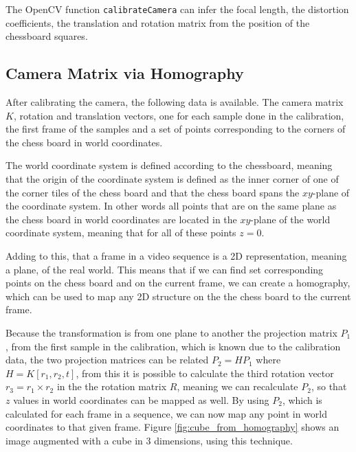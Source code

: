 \documentclass[a4paper,11pt]{article}
\begin{document}
The OpenCV function \texttt{calibrateCamera} can infer the focal length, the distortion coefficients, the translation and rotation matrix from the position of the chessboard squares.

\subsection{Camera Matrix via Homography}
After calibrating the camera, the following data is available. The camera matrix $K$, rotation and translation vectors, one for each sample done in the calibration, the first frame of the samples and a set of points corresponding to the corners of the chess board in world coordinates.

The world coordinate system is defined according to the chessboard, meaning that the origin of the coordinate system is defined as the inner corner of one of the corner tiles of the chess board and that the chess board spans the $xy$-plane of the coordinate system. In other words all points that are on the same plane as the chess board in world coordinates are located in the $xy$-plane of the world coordinate system, meaning that for all of these points $z=0$.

Adding to this, that a frame in a video sequence is a 2D representation, meaning a plane, of the real world. This means that if we can find set corresponding points on the chess board and on the current frame, we can create a homography, which can be used to map any 2D structure on the the chess board to the current frame.

Because the transformation is from one plane to another the projection matrix $P_1$, from  the first sample in the calibration, which is known due to the calibration data, the two projection matrices can be related $P_2 = H P_1$ where $H = K[r_1,r_2,t]$, from this it is possible to calculate the third rotation vector $r_3 = r_1 \times r_2$ in the the rotation matrix $R$, meaning we can recalculate $P_2$, so that $z$ values in world coordinates can be mapped as well. By using $P_2$, which is calculated for each frame in a sequence, we can now map any point in world coordinates to that given frame. Figure \ref{fig:cube_from_homography} shows an image augmented with a cube in 3 dimensions, using this technique.
\end{document}
